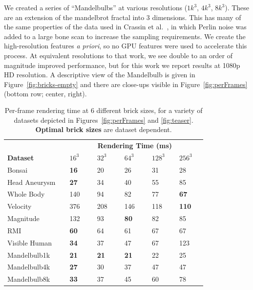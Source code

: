 We created a series of ``Mandelbulbs'' at various resolutions ($1k^3$,
$4k^3$, $8k^3$).  These are an extension of the mandelbrot fractal into
3 dimensions.  This has many of the same properties of the data used in
Crassin et al.~\cite{Crassin:2009:Gigavoxels}, in which Perlin noise
was added to a large bone scan to increase the sampling requirements.
We
create the high-resolution features \textit{a priori}, so no GPU
features were used to accelerate this process.  At equivalent
resolutions to that work, we see double to an order of magnitude
improved performance, but for this work we report results at 1080p HD
resolution.  A descriptive view of the Mandelbulb is
given in Figure~\ref{fig:bricks-empty} and there
are close-ups visible in Figure~\ref{fig:perFrames} (bottom row;
center, right).

\begin{table}
  \centering
  \caption{Per-frame rendering time at 6 different brick sizes, for
  a variety of datasets depicted in Figures~\ref{fig:perFrames} and
  \ref{fig:teaser}.  \textbf{Optimal brick sizes} are
  dataset dependent.}
  \label{tbl:timings}

  \begin{tabular*}{\linewidth}{|p{0.25825\linewidth}|p{0.11\linewidth}|p{0.11\linewidth}|p{0.11\linewidth}|p{0.11\linewidth}|p{0.11\linewidth}|}\hline
    & \multicolumn{5}{c|}{\textbf{Rendering Time (ms)}}\\
    \cline{2-6}
    \multicolumn{1}{|l|}{\textbf{Dataset}}
                  & $16^3$ & $32^3$ & $64^3$ & $128^3$ & $256^3$ \\\hline
    Bonsai        & {\bf 16} & 20     & 26         & 31  & 28        \\
    Head Aneurysm & {\bf 27} & 34     & 40         & 55  & 85        \\
    Whole Body    & 140      & 94     & 82         & 77  & {\bf 67}  \\
    Velocity      & 376      & 208    & 146        & 118 & {\bf 110} \\
    Magnitude     & 132      & 93     & {\bf 80}   & 82  & 85        \\
    RMI           & {\bf 60} & 64     & 61         & 67  & 67        \\
    Visible Human & {\bf 34} & 37     & 47         & 67  & 123       \\
    Mandelbulb1k  & {\bf 21} & {\bf 21} & {\bf 21} & 22  & 25        \\
    Mandelbulb4k  & {\bf 27} & 30     & 37         & 47  & 47        \\
    Mandelbulb8k  & {\bf 33} & 37     & 45         & 60  & 78        \\\hline
  \end{tabular*}
\end{table}

